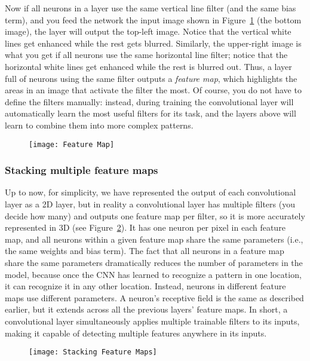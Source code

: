 Now if all neurons in a layer use the same vertical line filter (and the same bias term), and you feed the network the input image shown in Figure~\ref{FeatureMap} (the bottom image), the layer will output the top-left image. Notice that the vertical white lines get enhanced while the rest gets blurred. Similarly, the upper-right image is what you get if all neurons use the same horizontal line filter; notice that the horizontal white lines get enhanced while the rest is blurred out. Thus, a layer full of neurons using the same filter outputs a \emph{feature map}, which highlights the areas in an image that activate the filter the most. Of course, you do not have to define the filters manually: instead, during training the convolutional layer will automatically learn the most useful filters for its task, and the layers above will learn to combine them into more complex patterns.
\begin{figure}[h!t]
\centering
\texttt{[image: Feature Map]}
\caption{}\label{FeatureMap}
\end{figure}
\subsubsection{Stacking multiple feature maps}
Up to now, for simplicity, we have represented the output of each convolutional layer as a 2D layer, but in reality a convolutional layer has multiple filters (you decide how many) and outputs one feature map per filter, so it is more accurately represented in 3D (see Figure~\ref{StackingFeatureMaps}). It has one neuron per pixel in each feature map, and all neurons within a given feature map share the same parameters (i.e., the same weights and bias term). The fact that all neurons in a feature map share the same parameters dramatically reduces the number of parameters in the model, because once the CNN has learned to recognize a pattern in one location, it can recognize it in any other location. Instead, neurons in different feature maps use different parameters. A neuron's receptive field is the same as described earlier, but it extends across all the previous layers' feature maps. In short, a convolutional layer simultaneously applies multiple trainable filters to its inputs, making it capable of detecting multiple features anywhere in its inputs.
\begin{figure}[h!t]
\centering
\texttt{[image: Stacking Feature Maps]}
\caption{}\label{StackingFeatureMaps}
\end{figure}

